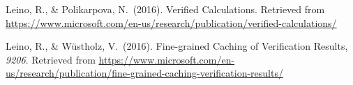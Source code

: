 \documentclass[12pt,twoside]{article}
\begin{document}
{\begin{thebibliography}{222}
Leino, R., \& Polikarpova, N.~(2016). Verified Calculations. Retrieved from \href{https://www.microsoft.com/en-us/research/publication/verified-calculations/}{{\ttfamily https://\hspace{0pt}www.\hspace{0pt}microsoft.\hspace{0pt}com/\hspace{0pt}en-\hspace{0pt}us/\hspace{0pt}research/\hspace{0pt}publication/\hspace{0pt}verified-\hspace{0pt}calculations/\hspace{0pt}}}\label{leino_verified_2016}%

Leino, R., \& Wüstholz, V.~(2016). Fine-grained Caching of Verification Results, \emph{9206}. Retrieved from \href{https://www.microsoft.com/en-us/research/publication/fine-grained-caching-verification-results/}{{\ttfamily https://\hspace{0pt}www.\hspace{0pt}microsoft.\hspace{0pt}com/\hspace{0pt}en-\hspace{0pt}us/\hspace{0pt}research/\hspace{0pt}publication/\hspace{0pt}fine-\hspace{0pt}grained-\hspace{0pt}caching-\hspace{0pt}verification-\hspace{0pt}results/\hspace{0pt}}}\label{leino_fine-grained_2016}%


\end{thebibliography}}
\end{document}
